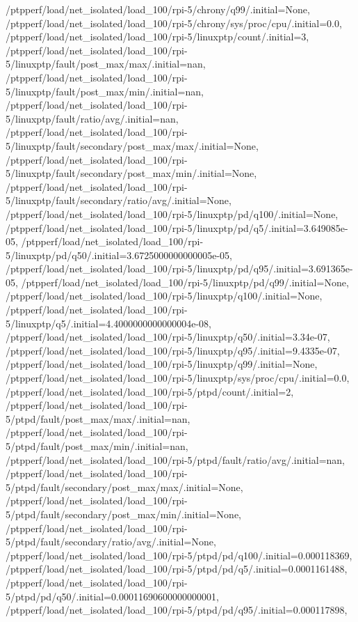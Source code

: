 {    /ptpperf/load/net_isolated/load_100/rpi-5/chrony/q99/.initial=None,
    /ptpperf/load/net_isolated/load_100/rpi-5/chrony/sys/proc/cpu/.initial=0.0,
    /ptpperf/load/net_isolated/load_100/rpi-5/linuxptp/count/.initial=3,
    /ptpperf/load/net_isolated/load_100/rpi-5/linuxptp/fault/post_max/max/.initial=nan,
    /ptpperf/load/net_isolated/load_100/rpi-5/linuxptp/fault/post_max/min/.initial=nan,
    /ptpperf/load/net_isolated/load_100/rpi-5/linuxptp/fault/ratio/avg/.initial=nan,
    /ptpperf/load/net_isolated/load_100/rpi-5/linuxptp/fault/secondary/post_max/max/.initial=None,
    /ptpperf/load/net_isolated/load_100/rpi-5/linuxptp/fault/secondary/post_max/min/.initial=None,
    /ptpperf/load/net_isolated/load_100/rpi-5/linuxptp/fault/secondary/ratio/avg/.initial=None,
    /ptpperf/load/net_isolated/load_100/rpi-5/linuxptp/pd/q100/.initial=None,
    /ptpperf/load/net_isolated/load_100/rpi-5/linuxptp/pd/q5/.initial=3.649085e-05,
    /ptpperf/load/net_isolated/load_100/rpi-5/linuxptp/pd/q50/.initial=3.6725000000000005e-05,
    /ptpperf/load/net_isolated/load_100/rpi-5/linuxptp/pd/q95/.initial=3.691365e-05,
    /ptpperf/load/net_isolated/load_100/rpi-5/linuxptp/pd/q99/.initial=None,
    /ptpperf/load/net_isolated/load_100/rpi-5/linuxptp/q100/.initial=None,
    /ptpperf/load/net_isolated/load_100/rpi-5/linuxptp/q5/.initial=4.4000000000000004e-08,
    /ptpperf/load/net_isolated/load_100/rpi-5/linuxptp/q50/.initial=3.34e-07,
    /ptpperf/load/net_isolated/load_100/rpi-5/linuxptp/q95/.initial=9.4335e-07,
    /ptpperf/load/net_isolated/load_100/rpi-5/linuxptp/q99/.initial=None,
    /ptpperf/load/net_isolated/load_100/rpi-5/linuxptp/sys/proc/cpu/.initial=0.0,
    /ptpperf/load/net_isolated/load_100/rpi-5/ptpd/count/.initial=2,
    /ptpperf/load/net_isolated/load_100/rpi-5/ptpd/fault/post_max/max/.initial=nan,
    /ptpperf/load/net_isolated/load_100/rpi-5/ptpd/fault/post_max/min/.initial=nan,
    /ptpperf/load/net_isolated/load_100/rpi-5/ptpd/fault/ratio/avg/.initial=nan,
    /ptpperf/load/net_isolated/load_100/rpi-5/ptpd/fault/secondary/post_max/max/.initial=None,
    /ptpperf/load/net_isolated/load_100/rpi-5/ptpd/fault/secondary/post_max/min/.initial=None,
    /ptpperf/load/net_isolated/load_100/rpi-5/ptpd/fault/secondary/ratio/avg/.initial=None,
    /ptpperf/load/net_isolated/load_100/rpi-5/ptpd/pd/q100/.initial=0.000118369,
    /ptpperf/load/net_isolated/load_100/rpi-5/ptpd/pd/q5/.initial=0.0001161488,
    /ptpperf/load/net_isolated/load_100/rpi-5/ptpd/pd/q50/.initial=0.00011690600000000001,
    /ptpperf/load/net_isolated/load_100/rpi-5/ptpd/pd/q95/.initial=0.000117898,
}

